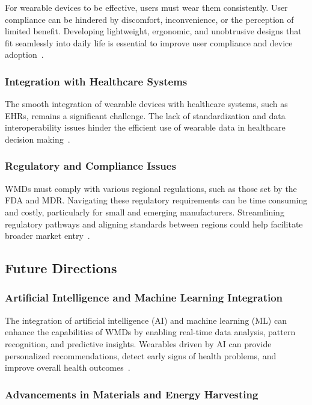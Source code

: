 \documentclass[journal]{IEEEtran}
\begin{document}
        For wearable devices to be effective, users must wear them consistently. User compliance can be hindered by discomfort, inconvenience, or the perception of limited benefit. Developing lightweight, ergonomic, and unobtrusive designs that fit seamlessly into daily life is essential to improve user compliance and device adoption~\cite{Luo2024, Hindelang2024}.

        \subsubsection{Integration with Healthcare Systems}

        The smooth integration of wearable devices with healthcare systems, such as EHRs, remains a significant challenge. The lack of standardization and data interoperability issues hinder the efficient use of wearable data in healthcare decision making~\cite{Cusack2024, Ravizza2019}.

        \subsubsection{Regulatory and Compliance Issues}

        WMDs must comply with various regional regulations, such as those set by the FDA and MDR. Navigating these regulatory requirements can be time consuming and costly, particularly for small and emerging manufacturers. Streamlining regulatory pathways and aligning standards between regions could help facilitate broader market entry~\cite{Babu2024,Ravizza2019}.

    \subsection{Future Directions}

        \subsubsection{Artificial Intelligence and Machine Learning Integration}

        The integration of artificial intelligence (AI) and machine learning (ML) can enhance the capabilities of WMDs by enabling real-time data analysis, pattern recognition, and predictive insights. Wearables driven by AI can provide personalized recommendations, detect early signs of health problems, and improve overall health outcomes~\cite{Nahavandi2022, Babu2024}.

        \subsubsection{Advancements in Materials and Energy Harvesting}
\end{document}
